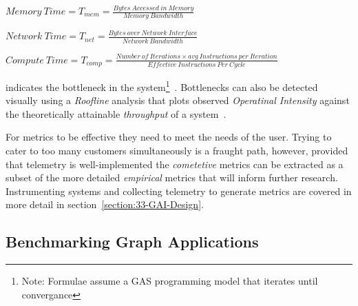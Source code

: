  $Memory~Time=T_{mem}=\frac{Bytes~Accessed~in~Memory}{Memory~Bandwidth}$

 $Network~Time=T_{net}=\frac{Bytes~over~Network~Interface}{Network~Bandwidth}$

 $Compute~Time=T_{comp}=\frac{Number~of~Iterations \times avg~Instructions~per~Iteration}{Effective~Instructions~Per~Cycle}$

\noindent indicates the bottleneck in the system\footnote{Note: Formulae assume a GAS programming model that iterates until convergance}~\cite{Intel2020}.
Bottlenecks can also be detected visually using a \textit{Roofline} analysis that plots observed \textit{Operatinal Intensity} against the theoretically attainable \textit{throughput} of a system~\cite{Williams2009}.

For metrics to be effective they need to meet the needs of the user. 
Trying to cater to too many customers simultaneously is a fraught path, however, provided that telemetry is well-implemented the \textit{cometetive} metrics can be extracted as a subset of the more detailed \textit{empirical} metrics that will inform further research.
Instrumenting systems and collecting telemetry to generate metrics are covered in more detail in section~\ref{section:33-GAI-Design}.

%
%

%
%

\subsection{Benchmarking Graph Applications}

%
%


